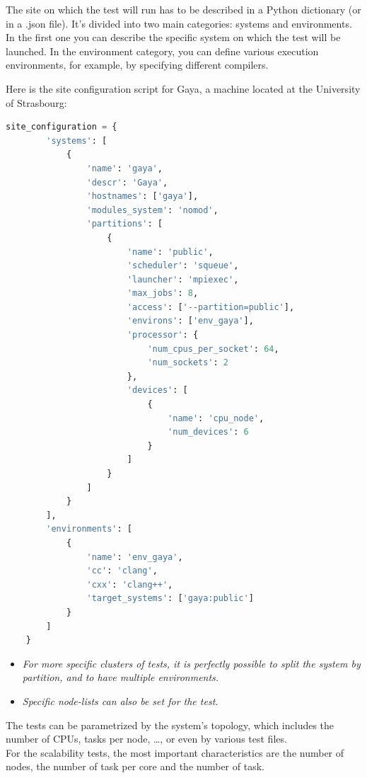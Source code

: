 \documentclass[12pt]{article}
\begin{document}
The site on which the test will run has to be described in a Python dictionary (or in a .json file).
It's divided into two main categories: systems and environments. \\
In the first one you can describe the specific system on which the test will be launched.
In the environment category, you can define various execution environments, for example, by specifying different compilers.

\newpage
Here is the site configuration script for Gaya, a machine located at the University of Strasbourg:

\begin{lstlisting}[language=python,caption={Gaya configuration}]
site_configuration = {
        'systems': [
            {
                'name': 'gaya',
                'descr': 'Gaya',
                'hostnames': ['gaya'],
                'modules_system': 'nomod',
                'partitions': [
                    {
                        'name': 'public',
                        'scheduler': 'squeue',
                        'launcher': 'mpiexec',
                        'max_jobs': 8,
                        'access': ['--partition=public'],
                        'environs': ['env_gaya'],
                        'processor': {
                            'num_cpus_per_socket': 64,
                            'num_sockets': 2
                        },
                        'devices': [
                            {
                                'name': 'cpu_node',
                                'num_devices': 6
                            }
                        ]
                    }
                ]
            }
        ],
        'environments': [
            {
                'name': 'env_gaya',
                'cc': 'clang',
                'cxx': 'clang++',
                'target_systems': ['gaya:public']
            }
        ]
    }
\end{lstlisting}

\begin{itemize}[left=1cm]
    \item \textit{For more specific clusters of tests, it is perfectly possible to split the system by partition, and to have multiple environments.}
    \item \textit{Specific node-lists can also be set for the test.}
\end{itemize}

The tests can be parametrized by the system's topology, which includes the number of CPUs, tasks per node, \ldots, or even by various test files. \\
For the scalability tests, the most important characteristics are the number of nodes, the number of task per core and the number of task. \\
\end{document}
